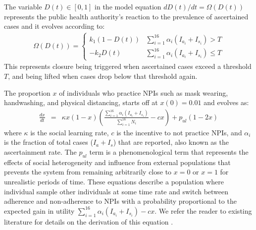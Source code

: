The variable $D(t) \in [0,1]$ in the model equation $dD(t)/dt = \Omega(D(t))$ represents the public health authority's reaction to the prevalence of ascertained cases and it evolves according to: 
\begin{eqnarray}
  \Omega(D(t)) =  \left\{
\begin{array}{ll}
    k_1 (1 - D(t)) &  \sum_{i=1}^{16}\alpha_i(I_{a_i} + I_{s_i}) > T\\
    - k_2 D(t) & \sum_{i=1}^{16}\alpha_i(I_{a_i} + I_{s_i}) \leq T
\end{array} 
\right. 
\label{shutdown}
\end{eqnarray}
This represents closure being triggered when ascertained cases exceed a threshold $T$, and being lifted when cases drop below that threshold again. 

The proportion $x$ of individuals who practice NPIs such as mask wearing, handwashing, and physical distancing, starts off at $x(0)=0.01$ and evolves as: 
\begin{eqnarray}
\frac{dx}{dt} &= &\kappa x (1-x) \left(\frac{\sum_{i=1}^{16}\alpha_i(I_{a_i} + I_{s_i})}{\sum_{i=1}^{16} N_i} - c x\right) + p_{ul}(1-2 x) 
\label{xeqn_new}
\end{eqnarray}
where $\kappa$ is the social learning rate, $c$ is the incentive to not practice NPIs, and $\alpha_i$ is the fraction of total cases ($I_a + I_s$) that are reported, also known as the ascertainment rate.  The $p_{ul}$ term is a phenomenological term that represents the effects of social heterogeneity and influence from external populations that prevents the system from remaining arbitrarily close to $x=0$ or $x=1$ for unrealistic periods of time.  These equations describe a population where individual sample other individuals at some time rate and switch between adherence and non-adherence to NPIs with a probability proportional to the expected gain in utility $\sum_{i=1}^{16}\alpha_i(I_{a_i} + I_{s_i}) - c x$. We refer the reader to existing literature for details on the derivation of this equation \cite{bauch2005imitation,innes2013impact,thampi2018socio,bauch2012evolutionary,oraby2014influence}. 

